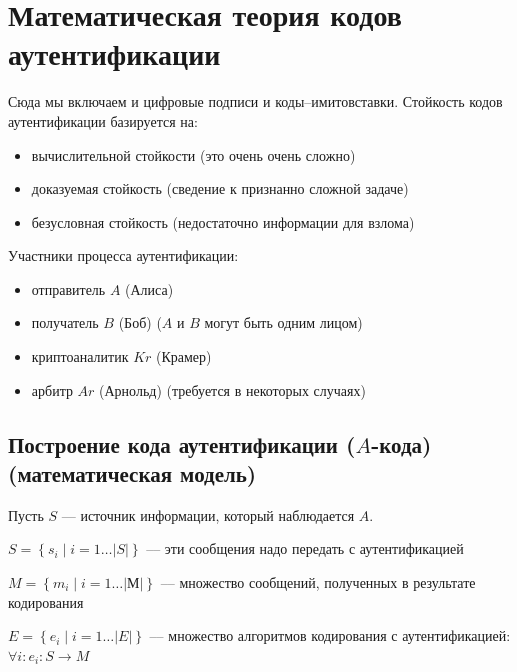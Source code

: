 \chapter[Математическая теория кодов аутентификации]{Математическая
теория кодов аутентификации}
Сюда мы включаем и цифровые подписи и коды–имитовставки.
Стойкость кодов аутентификации базируется на:

\begin{itemize}
\item вычислительной стойкости (это очень очень сложно)
\item доказуемая стойкость (сведение к признанно сложной задаче)
\item безусловная стойкость (недостаточно информации для взлома)
\end{itemize}
Участники процесса аутентификации:

\begin{itemize}
\item отправитель $A$ (Алиса)
\item получатель $B$ (Боб) ($A$ и $B$ могут быть одним лицом)
\item криптоаналитик $Kr$ (Крамер) 
\item арбитр $Ar$ (Арнольд) (требуется в некоторых случаях)
\end{itemize}
\section{Построение кода аутентификации ($A$-кода)
(математическая модель)}

Пусть $S$ --- источник информации, который наблюдается $A$.

$S=\left\{{s}_{i} \mid i=1{\dots}\left|S\right|\right\}$  --–  эти сообщения
надо передать с аутентификацией

$M=\left\{{m}_{i} \mid i=1{\dots}\left|\text{М}\right|\right\}$ –-- множество
сообщений, полученных в результате кодирования

$E=\left\{{e}_{i} \mid i=1{\dots}\left|E\right|\right\}$ --– множество
алгоритмов кодирования с аутентификацией: 
${\forall}i:{e}_{i}:S\rightarrow M$

